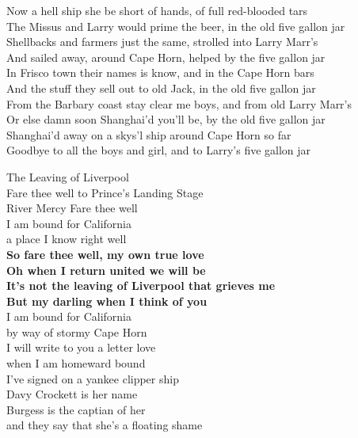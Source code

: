 \documentclass[letterpaper,9pt]{article}
\begin{document}
Now a hell ship she be short of hands, of full red-blooded tars \\
The Missus and Larry would prime the beer, in the old five gallon jar \\

Shellbacks and farmers just the same, strolled into Larry Marr's \\
And sailed away, around Cape Horn, helped by the five gallon jar \\

In Frisco town their names is know, and in the Cape Horn bars \\
And the stuff they sell out to old Jack, in the old five gallon jar \\

From the Barbary coast stay clear me boys, and from old Larry Marr's \\
Or else damn soon Shanghai'd you'll be, by the old five gallon jar \\

Shanghai'd away on a skys'l ship around Cape Horn so far \\
Goodbye to all the boys and girl, and to Larry's five gallon jar \\

\newpage
{}
\Huge
The Leaving of Liverpool\\

\Large
Fare thee well to Prince's Landing Stage \\
River Mercy Fare thee well \\
I am bound for California \\
a place I know right well \\

\textbf{So fare thee well, my own true love \\
Oh when I return united we will be \\
It's not the leaving of Liverpool that grieves me \\
But my darling when I think of you} \\

I am bound for California \\
by way of stormy Cape Horn \\
I will write to you a letter love \\
when I am homeward bound \\

I've signed on a yankee clipper ship \\
Davy Crockett is her name \\
Burgess is the captian of her \\
and they say that she's a floating shame \\
\end{document}

